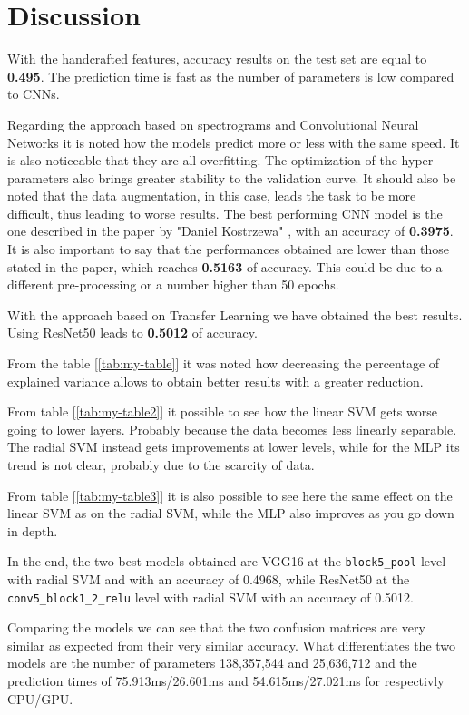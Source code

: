 \section{Discussion}
With the handcrafted features, accuracy results on the test set are equal to \textbf{0.495}. The prediction time is fast as the number of parameters is low compared to CNNs.

Regarding the approach based on spectrograms and Convolutional Neural Networks it is noted how the models predict more or less with the same speed. It is also noticeable that they are all overfitting.
The optimization of the hyper-parameters also brings greater stability to the validation curve.
It should also be noted that the data augmentation, in this case, leads the task to be more difficult, thus leading to worse results.
The best performing CNN model is the one described in the paper by "Daniel Kostrzewa" \cite{kostrzewa2021music}, with an accuracy of \textbf{0.3975}. It is also important to say that the performances obtained are lower than those stated in the paper, which reaches \textbf{0.5163} of accuracy. This could be due to a different pre-processing or a number higher than 50 epochs.

With the approach based on Transfer Learning we have obtained the best results. Using ResNet50 leads to \textbf{0.5012} of accuracy.

From the table [\ref{tab:my-table}] it was noted how decreasing the percentage of explained variance allows to obtain better results with a greater reduction.

From table [\ref{tab:my-table2}] it possible to see how the linear SVM gets worse going to lower layers. Probably because the data becomes less linearly separable.
The radial SVM instead gets improvements at lower levels, while for the MLP its trend is not clear, probably due to the scarcity of data.

From table [\ref{tab:my-table3}] it is also possible to see here the same effect on the linear SVM as on the radial SVM, while the MLP also improves as you go down in depth.

In the end, the two best models obtained are VGG16 at the \texttt{block5\_pool} level with radial SVM and with an accuracy of 0.4968, while ResNet50 at the \texttt{conv5\_block1\_2\_relu} level with radial SVM with an accuracy of 0.5012.

\noindent
Comparing the models we can see that the two confusion matrices are very similar as expected from their very similar accuracy.
What differentiates the two models are the number of parameters 138,357,544 and 25,636,712 and the prediction times of 75.913ms/26.601ms and 54.615ms/27.021ms for respectivly CPU/GPU.

